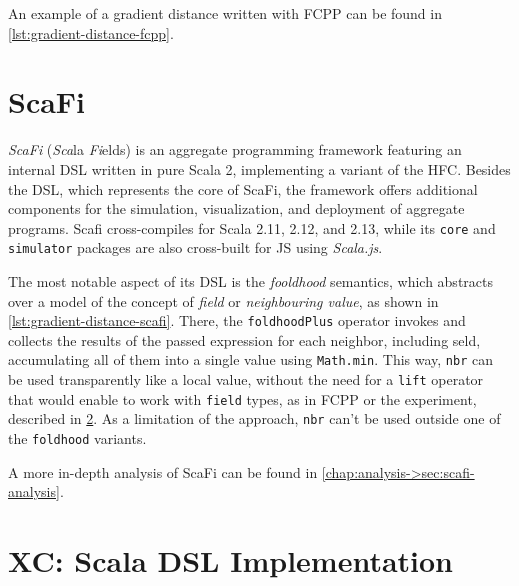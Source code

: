 An example of a gradient distance written with FCPP can be found in \cref{lst:gradient-distance-fcpp}.




\section{ScaFi} \label{chap:state-of-the-art->sec:scafi}

\textit{ScaFi} (\textit{Sca}la \textit{Fi}elds) is an aggregate programming framework featuring an internal \ac{DSL} written in pure Scala 2\cite{scafi}, implementing a variant of the \ac{HFC}.
%
Besides the \ac{DSL}, which represents the core of ScaFi, the framework offers additional components for the simulation, visualization, and deployment of aggregate programs.
%
Scafi cross-compiles for Scala 2.11, 2.12, and 2.13, while its \texttt{core} and \texttt{simulator} packages are also cross-built for \ac{JS} using \textit{Scala.js}\cite{scala-js}.

The most notable aspect of its \ac{DSL} is the \textit{fooldhood} semantics, which abstracts over a model of the concept of \textit{field} or \textit{neighbouring value}, as shown in \cref{lst:gradient-distance-scafi}.
%
There, the \texttt{foldhoodPlus} operator invokes and collects the results of the passed expression for each neighbor, including seld, accumulating all of them into a single value using \texttt{Math.min}.
%
This way, \texttt{nbr} can be used transparently like a local value, without the need for a \texttt{lift} operator that would enable to work with \texttt{field} types, as in FCPP or the  experiment, described in \cref{chap:state-of-the-art->sec:xc-experiment}.
%
As a limitation of the approach, \texttt{nbr} can't be used outside one of the \texttt{foldhood} variants.



A more in-depth analysis of ScaFi can be found in \cref{chap:analysis->sec:scafi-analysis}.

\section{XC: Scala DSL Implementation} \label{chap:state-of-the-art->sec:xc-experiment}

